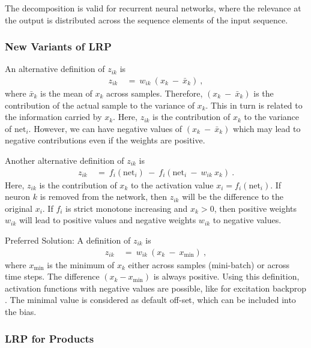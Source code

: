 \documentclass{article}
\newcommand\net{\mathrm{net}}
\begin{document}
\begin{appendices}
The decomposition is valid for recurrent neural networks,
where the relevance at the output
is distributed across the sequence elements of the
input sequence.


\subsubsection{New Variants of LRP}
\label{sec:ALRPvariants}


An alternative definition of $z_{ik}$ is
\begin{align}
  z_{ik}\ &= \ w_{ik} \ (x_k \ - \ \bar{x}_k ) \ ,
\end{align} 
where $\bar{x}_k$ is the mean of $x_k$ across samples.
Therefore, $(x_k \ - \ \bar{x}_k )$ is the contribution of the
actual sample to the variance of $x_k$. This in turn is related to
the information carried by $x_k$.
Here, $z_{ik}$ is the contribution of $x_k$ to the variance of
$\net_i$. However, we can have negative values of
$(x_k \ - \ \bar{x}_k )$ which may lead to negative contributions even
if the weights are positive.

Another alternative definition of $z_{ik}$ is
\begin{align}
  z_{ik} \ &= \ f_i(\net_i) \ - \ f_i(\net_i \ - \
            w_{ik} \ x_k) \ .
\end{align} 
Here, $z_{ik}$ is the contribution of $x_k$ to the activation
value $x_i=f_i(\net_i)$.
If neuron $k$ is removed from the network,
then  $z_{ik}$ will be the difference to the original $x_i$.
If $f_i$ is strict monotone increasing and $x_k>0$, then
positive weights $w_{ik}$ will lead to positive values and negative weights
$w_{ik}$ to negative values.


\noindent Preferred Solution:\newline
A definition of $z_{ik}$ is
\begin{align}
  z_{ik}\ &= \ w_{ik} \ (x_k \ - \ x_{\min} ) \ ,
\end{align} 
where $x_{\min}$ is the minimum of $x_k$ either across samples
(mini-batch) or across time steps.
The difference $(x_k  -  x_{\min} )$ is always positive.
Using this definition,
activation functions with negative values are possible, like for
excitation backprop \cite{Zhang:16}.
The minimal value is considered as default off-set, which can be
included into the bias. 


\subsubsection{LRP for Products}
\label{sec:ALRPproduct}



\end{appendices}
\end{document}
